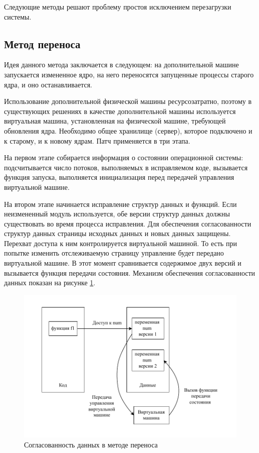 Следующие методы решают проблему простоя исключением перезагрузки системы.

\subsection{Метод переноса}

Идея данного метода \cite{autopod} заключается в следующем: на дополнительной машине запускается измененное ядро, на него переносятся запущенные процессы старого ядра, и оно останавливается.

Использование дополнительной физической машины ресурсозатратно, поэтому в существующих решениях \cite{lucos} в качестве дополнительной машины используется виртуальная машина, установленная на физической машине, требующей обновления ядра. Необходимо общее хранилище (сервер), которое подключено и к старому, и к новому ядрам. Патч применяется в три этапа.

На первом этапе собирается информация о состоянии операционной системы: подсчитывается число потоков, выполняемых в исправляемом коде, вызывается функция запуска, выполняется инициализация перед передачей управления виртуальной машине.

На втором этапе начинается исправление структур данных и функций. Если неизмененный модуль используется, обе версии структур данных должны существовать во время процесса исправления. Для обеспечения согласованности структур данных страницы исходных данных и новых данных защищены. Перехват доступа к ним контролируется виртуальной машиной. То есть при попытке изменить отслеживаемую страницу управление будет передано виртуальной машине. В этот момент сравнивается содержимое двух версий и вызывается функция передачи состояния. Механизм обеспечения согласованности данных показан на рисунке \ref{img:vm}.

\begin{figure}[H]
	\begin{center}
		\includegraphics[scale=0.8]{img/vm.pdf}
	\end{center}
	\captionsetup{justification=centering}
	\caption{Согласованность данных в методе переноса}
	\label{img:vm}
\end{figure}

